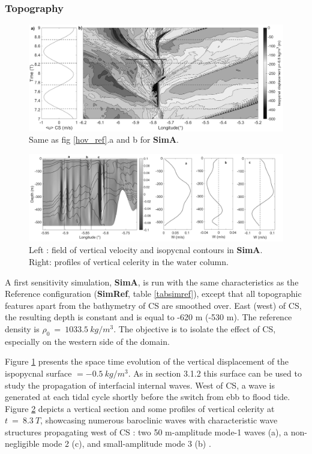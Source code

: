 \documentclass[a4paper,12pt]{article}
\begin{document}
\subsubsection{Topography}

\begin{figure}[!t]
\centering
\includegraphics[width=1\linewidth]{hov_p-05_CS.png}
\caption{Same as fig \ref{hov_ref}.a and b for \textbf{SimA}.}
\label{hov_CS}
\end{figure}
\begin{figure}[!h]
\centering
\includegraphics[width=1\linewidth]{w_it515_modes_CS.png}
\caption{Left : field of vertical velocity  and isopycnal contours in \textbf{SimA}. Right: profiles of vertical celerity in the water column.}
\label{figCS_2}
\end{figure}

A first sensitivity simulation, \textbf{SimA}, is run with the same characteristics as the Reference configuration (\textbf{SimRef}, table \ref{tabsimref}), except that all topographic features apart from the bathymetry of CS are smoothed over. East (west) of CS, the resulting depth is constant and is equal to -620 m (-530 m). The reference density is $\rho_0\ =\ 1033.5\ kg/m^3$. The objective is to isolate the effect of CS, especially on the western side of the domain.

Figure \ref{hov_CS} presents the space time evolution of the vertical displacement of the ispopycnal surface $=-0.5\ kg/m^3$. As in section 3.1.2 this surface can be used to study the propagation of interfacial internal waves. West of CS, a wave is generated at each tidal cycle shortly before the switch from ebb to flood tide. Figure \ref{figCS_2} depicts a vertical section and some profiles of vertical celerity at $t\ =\ 8.3\ T$, showcasing numerous baroclinic waves with characteristic wave structures propagating west of CS : two 50 m-amplitude mode-1 waves (a), a non-negligible mode 2 (c), and small-amplitude mode 3 (b) .
\end{document}
